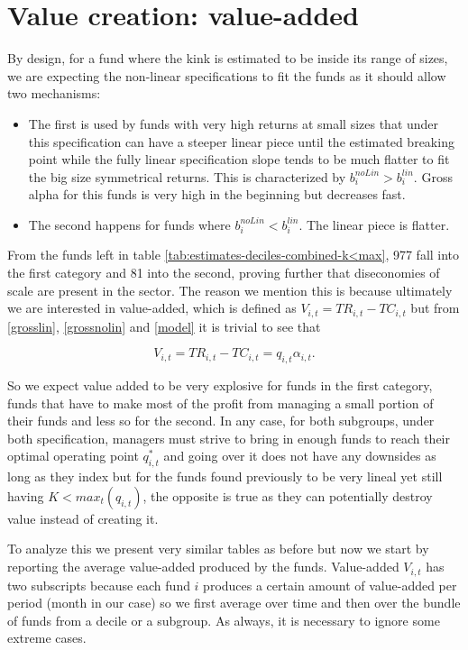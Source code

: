 \documentclass[12pt]{article}
\begin{document}
\section{Value creation: value-added}

By design, for a fund where the kink is estimated to be inside its range of sizes, we are expecting the non-linear specifications to fit the funds as it should allow two mechanisms:

\begin{itemize}
    \item The first is used by funds with very high returns at small sizes that under this specification can have a steeper linear piece until the estimated breaking point while the fully linear specification slope tends to be much flatter to fit the big size symmetrical returns. This is characterized by $b^{noLin}_i>b_i^{lin}$. Gross alpha for this funds is very high in the beginning but decreases fast.
    \item The second happens for funds where $b^{noLin}_i<b_i^{lin}$. The linear piece is flatter.
\end{itemize}

From the funds left in table \ref{tab:estimates-deciles-combined-k<max}, 977 fall into the first category and 81 into the second, proving further that diseconomies of scale are present in the sector. The reason we mention this is because ultimately we are interested in value-added, which is defined as $V_{i,t}=TR_{i,t}-TC_{i,t}$ but from \ref{grosslin}, \ref{grossnolin} and \ref{model} it is trivial to see that 

\begin{equation}
    V_{i,t}=TR_{i,t}-TC_{i,t}=q_{i,t}\alpha_{i,t}.
\end{equation}

So we expect value added to be very explosive for funds in the first category, funds that have to make most of the profit from managing a small portion of their funds and less so for the second. In any case, for both subgroups, under both specification, managers must strive to bring in enough funds to reach their optimal operating point $q_{i,t}^*$ and going over it does not have any downsides as long as they index but for the funds found previously to be very lineal yet still having $K<max_{t}(q_{i,t})$, the opposite is true as they can potentially destroy value instead of creating it.

\par To analyze this we present very similar tables as before but now we start by reporting the average value-added produced by the funds. Value-added $V_{i,t}$ has two subscripts because each fund $i$ produces a certain amount of value-added per period (month in our case) so we first average over time and then over the bundle of funds from a decile or a subgroup. As always, it is necessary to ignore some extreme cases.
\end{document}
